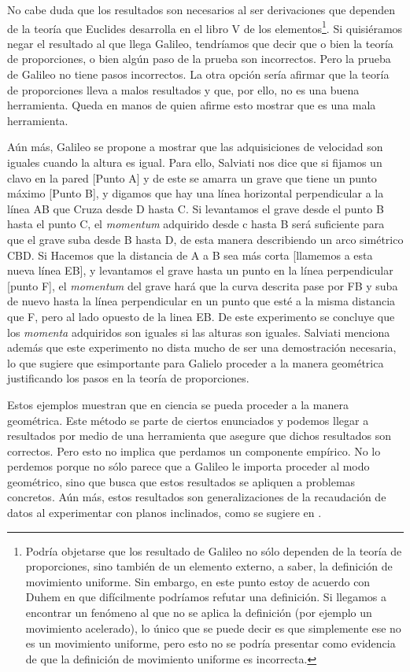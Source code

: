 No cabe duda que los resultados son necesarios al ser derivaciones que dependen de la teoría que Euclides desarrolla en el libro V de los elementos\footnote{Podría objetarse que los resultado de Galileo no sólo dependen de la teoría de proporciones, sino también de un elemento externo, a saber, la definición de movimiento uniforme. Sin embargo, en este punto estoy de acuerdo con Duhem \cite{Duhem1976} en que difícilmente podríamos refutar una definición. Si llegamos a encontrar un fenómeno al que no se aplica la definición (por ejemplo un movimiento acelerado), lo único que se puede decir es que simplemente ese no es un movimiento uniforme, pero esto no se podría presentar como evidencia de que la definición de movimiento uniforme es incorrecta.}. Si quisiéramos negar el resultado al que llega Galileo, tendríamos que decir que o bien la teoría de proporciones, o bien algún paso de la prueba son incorrectos. Pero la prueba de Galileo no tiene pasos incorrectos. La otra opción sería afirmar que la teoría de proporciones lleva a malos resultados y que, por ello, no es una buena herramienta. Queda en manos de quien afirme esto mostrar que es una mala herramienta.

Aún más, Galileo se propone a mostrar que las adquisiciones de velocidad son iguales cuando la altura es igual. Para ello, Salviati \cite[p. 232]{galtre} nos dice que si fijamos un clavo en la pared [Punto A] y de este se amarra un grave que tiene un punto máximo [Punto B], y digamos que hay una línea horizontal perpendicular a la línea AB que Cruza desde D hasta C. Si levantamos el grave desde el punto B hasta el punto C, el \textit{momentum} adquirido desde c hasta B será suficiente para que el grave suba desde B hasta D, de esta manera describiendo un arco simétrico CBD. Si Hacemos que la distancia de A a B sea más corta [llamemos a esta nueva línea EB], y levantamos el grave hasta un punto en la línea perpendicular [punto F], el \textit{momentum} del grave hará que la curva descrita pase por FB y suba de nuevo hasta la línea perpendicular en un punto que esté a la misma distancia que F, pero al lado opuesto de la linea EB. De este experimento se concluye que los \textit{momenta} adquiridos son iguales si las alturas son iguales. Salviati menciona además que este experimento no dista mucho de ser una demostración necesaria, lo que sugiere que esimportante para Galielo proceder a la manera geométrica justificando los pasos en la teoría de proporciones.

Estos ejemplos muestran que en ciencia se pueda proceder a la manera geométrica. Este método se parte de ciertos enunciados y podemos llegar a resultados por medio de una herramienta que asegure que dichos resultados son correctos. Pero esto no implica que perdamos un componente empírico. No lo perdemos porque no sólo parece que a Galileo le importa proceder al modo geométrico, sino que busca que estos resultados se apliquen a problemas concretos. Aún más, estos resultados son generalizaciones de la recaudación de datos al experimentar con planos inclinados, como se sugiere en \cite[p. 231]{galtre}.

